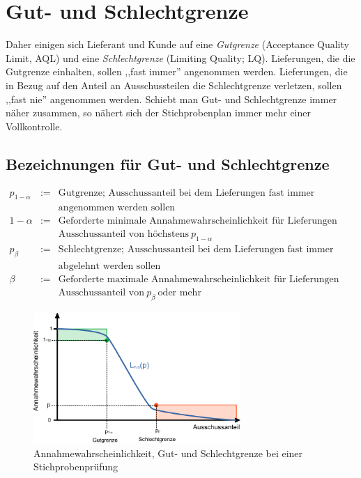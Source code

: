 \documentclass[a4paper,11pt,oneside]{article}
\begin{document}
\section{Gut- und Schlechtgrenze}

Daher einigen sich Lieferant und Kunde auf eine \emph{Gutgrenze} (Acceptance Quality Limit, AQL) und eine \emph{Schlechtgrenze} (Limiting Quality; LQ). Lieferungen, die die Gutgrenze einhalten, sollen ,,fast immer'' angenommen werden. Lieferungen, die in Bezug auf den Anteil an Ausschussteilen die Schlechtgrenze verletzen, sollen ,,fast nie'' angenommen werden. Schiebt man Gut- und Schlechtgrenze immer näher zusammen, so nähert sich der Stichprobenplan immer mehr einer Vollkontrolle.

\subsection*{Bezeichnungen für Gut- und Schlechtgrenze}

\begin{eqnarray*}
p_{1-\alpha}&:=&\text{Gutgrenze; Ausschussanteil bei dem Lieferungen fast immer}\\
~&~&\text{angenommen werden sollen}\\[2ex]
1-\alpha&:=&\text{Geforderte minimale Annahmewahrscheinlichkeit für Lieferungen mit einem}\\
~&~&\text{Ausschussanteil von höchstens}~ p_{1-\alpha}\\[2ex]
p_\beta&:=&\text{Schlechtgrenze; Ausschussanteil bei dem Lieferungen fast immer}\\
~&~&\text{abgelehnt werden sollen}\\[2ex]
\beta&:=&\text{Geforderte maximale Annahmewahrscheinlichkeit für Lieferungen mit einem}\\
~&~&\text{Ausschussanteil von}~ p_{\beta} ~\text{oder mehr}
\end{eqnarray*}

\begin{figure}[H]
\begin{center}
\includegraphics[width=0.7\textwidth]{OperationCharacteristics_de.pdf}
\end{center}
\caption{Annahmewahrscheinlichkeit, Gut- und Schlechtgrenze bei einer Stichprobenprüfung}
\label{fig:L}
\end{figure}
\end{document}
